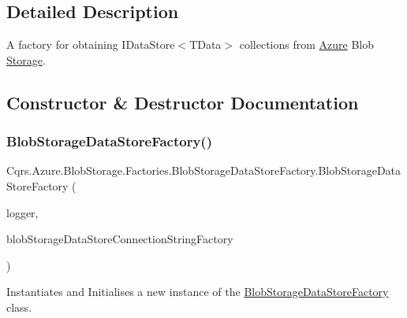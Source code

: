\subsection{Detailed Description}
A factory for obtaining I\+Data\+Store$<$\+T\+Data$>$ collections from \hyperlink{namespaceCqrs_1_1Azure}{Azure} Blob \hyperlink{namespaceCqrs_1_1Azure_1_1Storage}{Storage}. 



\subsection{Constructor \& Destructor Documentation}
\mbox{\label{classCqrs_1_1Azure_1_1BlobStorage_1_1Factories_1_1BlobStorageDataStoreFactory_a448e77623db63d7a66fc6b6c75466eac_a448e77623db63d7a66fc6b6c75466eac}} 
\subsubsection{\texorpdfstring{Blob\+Storage\+Data\+Store\+Factory()}{BlobStorageDataStoreFactory()}}
{\footnotesize\ttfamily Cqrs.\+Azure.\+Blob\+Storage.\+Factories.\+Blob\+Storage\+Data\+Store\+Factory.\+Blob\+Storage\+Data\+Store\+Factory (\begin{DoxyParamCaption}\item[{I\+Logger}]{logger,  }\item[{\hyperlink{interfaceCqrs_1_1Azure_1_1BlobStorage_1_1DataStores_1_1IBlobStorageDataStoreConnectionStringFactory}{I\+Blob\+Storage\+Data\+Store\+Connection\+String\+Factory}}]{blob\+Storage\+Data\+Store\+Connection\+String\+Factory }\end{DoxyParamCaption})\hspace{0.3cm}{\ttfamily [protected]}}



Instantiates and Initialises a new instance of the \hyperlink{classCqrs_1_1Azure_1_1BlobStorage_1_1Factories_1_1BlobStorageDataStoreFactory}{Blob\+Storage\+Data\+Store\+Factory} class. 




